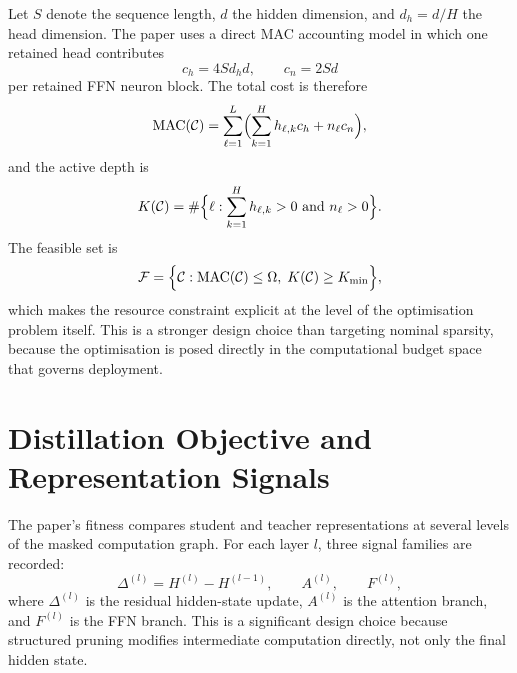 Let $S$ denote the sequence length, $d$ the hidden dimension, and $d_h=d/H$ the head dimension. The paper uses a direct MAC accounting model in which one retained head contributes
\begin{equation}
  c_h = 4Sd_hd,
  \qquad
  c_n = 2Sd
  \label{eq:design_mac_unit}
\end{equation}
per retained FFN neuron block. The total cost is therefore
\begin{equation}
  \mathrm{MAC}(\mathcal{C})
  = \sum_{\ell=1}^{L}
  \Bigl(
    \sum_{k=1}^{H} h_{\ell,k} c_h + n_\ell c_n
  \Bigr),
  \label{eq:design_mac}
\end{equation}
and the active depth is
\begin{equation}
  K(\mathcal{C})
  =
  \#\Bigl\{
    \ell : \sum_{k=1}^{H} h_{\ell,k}>0 \text{ and } n_\ell>0
  \Bigr\}.
  \label{eq:design_active_depth}
\end{equation}
The feasible set is
\begin{equation}
  \mathcal{F}
  =
  \Bigl\{
    \mathcal{C} : \mathrm{MAC}(\mathcal{C}) \leq \Omega,\; K(\mathcal{C}) \geq K_{\min}
  \Bigr\},
  \label{eq:design_feasible}
\end{equation}
which makes the resource constraint explicit at the level of the optimisation problem itself. This is a stronger design choice than targeting nominal sparsity, because the optimisation is posed directly in the computational budget space that governs deployment.

\section{Distillation Objective and Representation Signals}
\label{subsec:fitness_design}

The paper's fitness compares student and teacher representations at several levels of the masked computation graph. For each layer $l$, three signal families are recorded:
\begin{equation}
  \Delta^{(l)} = H^{(l)} - H^{(l-1)},
  \qquad
  A^{(l)},
  \qquad
  F^{(l)},
  \label{eq:design_signals}
\end{equation}
where $\Delta^{(l)}$ is the residual hidden-state update, $A^{(l)}$ is the attention branch, and $F^{(l)}$ is the FFN branch. This is a significant design choice because structured pruning modifies intermediate computation directly, not only the final hidden state.

